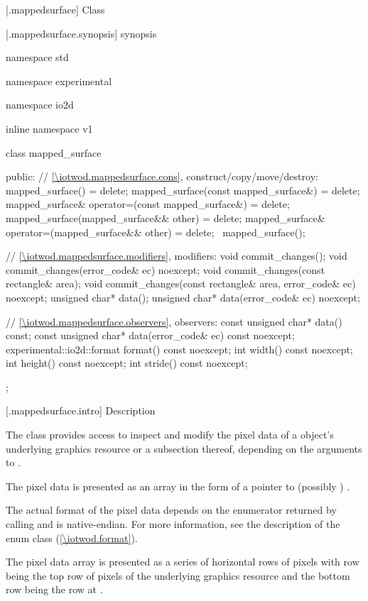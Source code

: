  [\iotwod.mappedsurface] {Class }

 [\iotwod.mappedsurface.synopsis] { synopsis}

\begin{codeblock}
namespace std { namespace experimental { namespace io2d { inline namespace v1 {
  class mapped_surface {
  public:
    // \ref{\iotwod.mappedsurface.cons}, construct/copy/move/destroy:
    mapped_surface() = delete;
    mapped_surface(const mapped_surface&) = delete;
    mapped_surface& operator=(const mapped_surface&) = delete;
    mapped_surface(mapped_surface&& other) = delete;
    mapped_surface& operator=(mapped_surface&& other) = delete;
    ~mapped_surface();
    
    // \ref{\iotwod.mappedsurface.modifiers}, modifiers:
    void commit_changes();
    void commit_changes(error_code& ec) noexcept;
    void commit_changes(const rectangle& area);
    void commit_changes(const rectangle& area, error_code& ec) noexcept;
    unsigned char* data();
    unsigned char* data(error_code& ec) noexcept;
    
    // \ref{\iotwod.mappedsurface.observers}, observers:
    const unsigned char* data() const;
    const unsigned char* data(error_code& ec) const noexcept;
    experimental::io2d::format format() const noexcept;
    int width() const noexcept;
    int height() const noexcept;
    int stride() const noexcept;
  };
} } } }
\end{codeblock}

 [\iotwod.mappedsurface.intro] { Description}

\pnum
{}
The  class provides access to inspect and modify the pixel data of a  object's underlying graphics resource or a subsection thereof, depending on the arguments to .

\pnum
The pixel data is presented as an array in the form of a pointer to (possibly ) .

\pnum
The actual format of the pixel data depends on the  enumerator returned by calling  and is native-endian. For more information, see the description of the  enum class (\ref{\iotwod.format}).

\pnum
The pixel data array is presented as a series of horizontal rows of pixels with row  being the top row of pixels of the underlying graphics resource and the bottom row being the row at .

